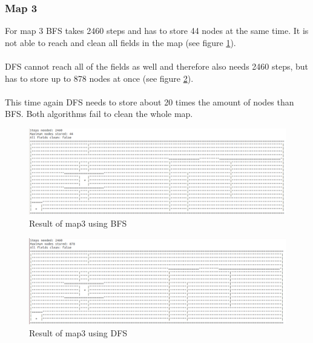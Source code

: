 \documentclass[paper=a4, fontsize=11pt]{scrartcl} %
\numberwithin{equation}{section} %
\numberwithin{figure}{section} %
\numberwithin{table}{section} %
\begin{document}
\subsubsection{Map 3}
For map 3 BFS takes 2460 steps and has to store 44 nodes at the same time. It is not able to reach and clean all fields in the map (see figure \ref{fig:map3_bfs}).\\\\
DFS cannot reach all of the fields as well and therefore also needs 2460 steps, but has to store up to 878 nodes at once (see figure \ref{fig:map3_dfs}).\\\\
This time again DFS needs to store about 20 times the amount of nodes than BFS. Both algorithms fail to clean the whole map.\\
\begin{figure}[Ht]
	\centering
  \includegraphics[width=1\textwidth]{images/map3_bfs.png}
	\caption{Result of map3 using BFS}
	\label{fig:map3_bfs}
\end{figure}

\begin{figure}[Ht]
	\centering
  \includegraphics[width=1\textwidth]{images/map3_dfs.png}
	\caption{Result of map3 using DFS}
	\label{fig:map3_dfs}
\end{figure}
\end{document}
